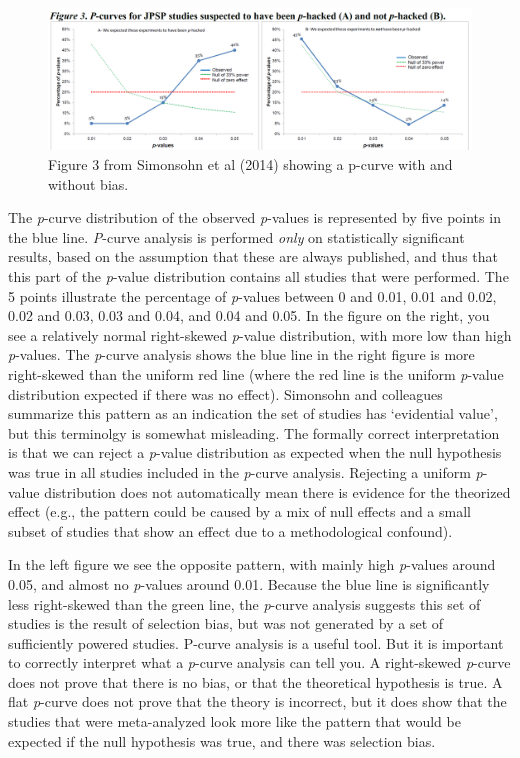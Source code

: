 \documentclass[
  oneside]{book}
\begin{document}
\begin{figure}

{\centering \includegraphics[width=1\linewidth]{images/pcurve} 

}

\caption{Figure 3 from Simonsohn et al (2014) showing a p-curve with and without bias.}\label{fig:pcurve}
\end{figure}

The \emph{p}-curve distribution of the observed \emph{p}-values is represented by five points in the blue line. \emph{P}-curve analysis is performed \emph{only} on statistically significant results, based on the assumption that these are always published, and thus that this part of the \emph{p}-value distribution contains all studies that were performed. The 5 points illustrate the percentage of \emph{p}-values between 0 and 0.01, 0.01 and 0.02, 0.02 and 0.03, 0.03 and 0.04, and 0.04 and 0.05. In the figure on the right, you see a relatively normal right-skewed \emph{p}-value distribution, with more low than high \emph{p}-values. The \emph{p}-curve analysis shows the blue line in the right figure is more right-skewed than the uniform red line (where the red line is the uniform \emph{p}-value distribution expected if there was no effect). Simonsohn and colleagues summarize this pattern as an indication the set of studies has `evidential value', but this terminolgy is somewhat misleading. The formally correct interpretation is that we can reject a \emph{p}-value distribution as expected when the null hypothesis was true in all studies included in the \emph{p}-curve analysis. Rejecting a uniform \emph{p}-value distribution does not automatically mean there is evidence for the theorized effect (e.g., the pattern could be caused by a mix of null effects and a small subset of studies that show an effect due to a methodological confound).

In the left figure we see the opposite pattern, with mainly high \emph{p}-values around 0.05, and almost no \emph{p}-values around 0.01. Because the blue line is significantly less right-skewed than the green line, the \emph{p}-curve analysis suggests this set of studies is the result of selection bias, but was not generated by a set of sufficiently powered studies. P-curve analysis is a useful tool. But it is important to correctly interpret what a \emph{p}-curve analysis can tell you. A right-skewed \emph{p}-curve does not prove that there is no bias, or that the theoretical hypothesis is true. A flat \emph{p}-curve does not prove that the theory is incorrect, but it does show that the studies that were meta-analyzed look more like the pattern that would be expected if the null hypothesis was true, and there was selection bias.
\end{document}
